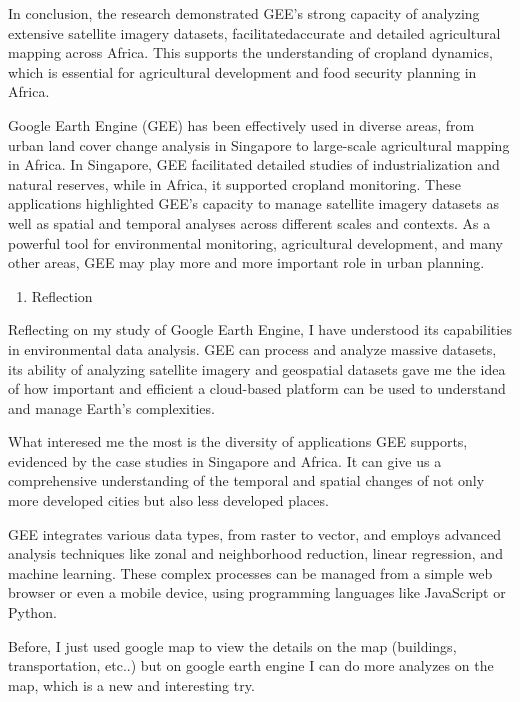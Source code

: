 \documentclass[
  letterpaper,
  DIV=11,
  numbers=noendperiod]{scrreprt}
\providecommand{\tightlist}{%
  \setlength{\itemsep}{0pt}\setlength{\parskip}{0pt}}\usepackage{longtable,booktabs,array}
\begin{document}
In conclusion, the research demonstrated GEE's strong capacity of
analyzing extensive satellite imagery datasets, facilitatedaccurate and
detailed agricultural mapping across Africa. This supports the
understanding of cropland dynamics, which is essential for agricultural
development and food security planning in Africa.

Google Earth Engine (GEE) has been effectively used in diverse areas,
from urban land cover change analysis in Singapore to large-scale
agricultural mapping in Africa. In Singapore, GEE facilitated detailed
studies of industrialization and natural reserves, while in Africa, it
supported cropland monitoring. These applications highlighted GEE's
capacity to manage satellite imagery datasets as well as spatial and
temporal analyses across different scales and contexts. As a powerful
tool for environmental monitoring, agricultural development, and many
other areas, GEE may play more and more important role in urban
planning.

\begin{enumerate}
\tightlist
\item
  Reflection
\end{enumerate}

Reflecting on my study of Google Earth Engine, I have understood its
capabilities in environmental data analysis. GEE can process and analyze
massive datasets, its ability of analyzing satellite imagery and
geospatial datasets gave me the idea of how important and efficient a
cloud-based platform can be used to understand and manage Earth's
complexities.

What interesed me the most is the diversity of applications GEE
supports, evidenced by the case studies in Singapore and Africa. It can
give us a comprehensive understanding of the temporal and spatial
changes of not only more developed cities but also less developed
places.

GEE integrates various data types, from raster to vector, and employs
advanced analysis techniques like zonal and neighborhood reduction,
linear regression, and machine learning. These complex processes can be
managed from a simple web browser or even a mobile device, using
programming languages like JavaScript or Python.

Before, I just used google map to view the details on the map
(buildings, transportation, etc..) but on google earth engine I can do
more analyzes on the map, which is a new and interesting try.

\end{document}
